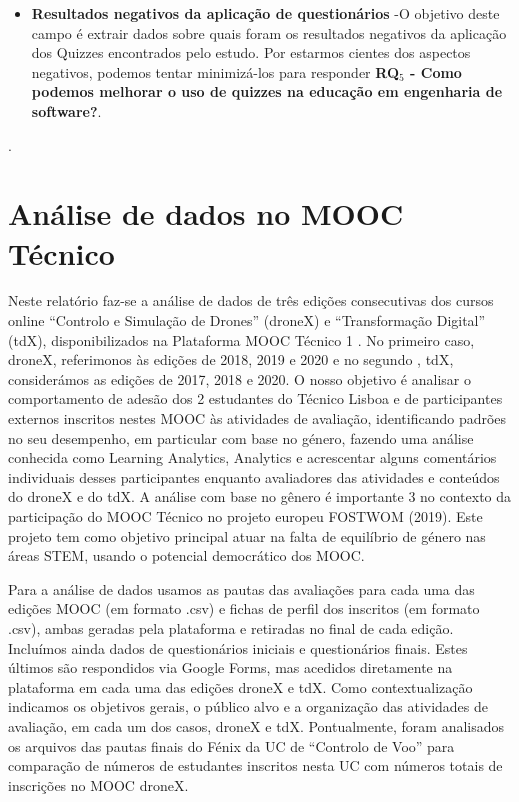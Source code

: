 \begin{itemize}
    \item\textbf{Resultados negativos da aplicação de questionários} -O objetivo deste campo é extrair dados sobre quais foram os resultados negativos da aplicação dos Quizzes encontrados pelo estudo. Por estarmos cientes dos aspectos negativos, podemos tentar minimizá-los para responder \textbf{RQ$_5$ -  Como podemos melhorar o uso de quizzes na educação em engenharia de software?}.
\end{itemize}.

\section{Análise de dados no MOOC Técnico}

Neste relatório faz-se a análise de dados de três edições consecutivas dos cursos online “Controlo e Simulação de Drones” (droneX) e “Transformação Digital” (tdX), disponibilizados na Plataforma MOOC Técnico 1 . No primeiro caso, droneX, referimonos às edições de 2018, 2019 e 2020 e no segundo , tdX, considerámos as edições de 2017, 2018 e 2020. O nosso objetivo é analisar o comportamento de adesão dos 2
estudantes do Técnico Lisboa e de participantes externos inscritos nestes MOOC às atividades de avaliação, identificando padrões no seu desempenho, em particular com base no género, fazendo uma análise conhecida como Learning Analytics, Analytics e acrescentar alguns comentários individuais desses participantes enquanto avaliadores das atividades e conteúdos do droneX e do tdX. A análise com base no gênero é importante 3 no contexto da participação do MOOC Técnico no projeto
europeu FOSTWOM (2019). Este projeto tem como objetivo principal atuar na falta de equilíbrio de género nas áreas STEM, usando o potencial democrático dos MOOC.

Para a análise de dados usamos as pautas das avaliações para cada uma das edições
MOOC (em formato .csv) e fichas de perfil dos inscritos (em formato .csv), ambas
geradas pela plataforma e retiradas no final de cada edição. Incluímos ainda dados de
questionários iniciais e questionários finais. Estes últimos são respondidos via Google
Forms, mas acedidos diretamente na plataforma em cada uma das edições droneX e tdX. Como contextualização indicamos os objetivos gerais, o público alvo e a organização das atividades de avaliação, em cada um dos casos, droneX e tdX. Pontualmente, foram analisados os arquivos das pautas finais do Fénix  da UC  de “Controlo de Voo” para comparação de números de estudantes inscritos nesta UC com números totais de inscrições no MOOC droneX.

